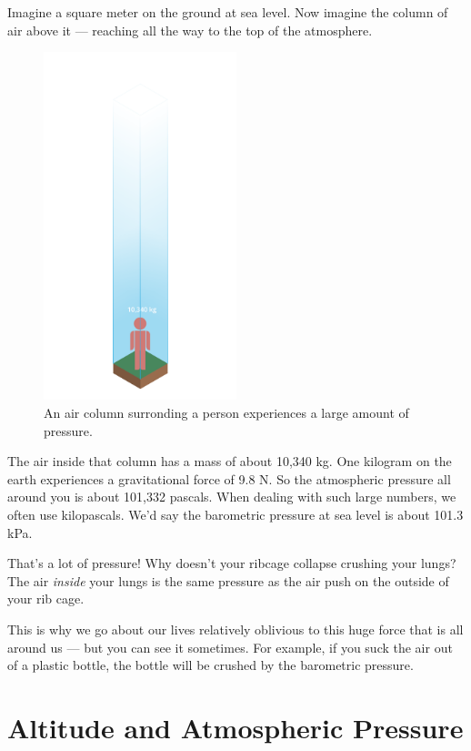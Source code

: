 Imagine a square meter on the ground at sea level.  Now imagine the column of air above it --- reaching all the way to the top of the atmosphere.
\begin{figure}[htbp]
    \centering
    \includegraphics[width=0.5\textwidth]{aircolumn.png}
    \caption{An air column surronding a person experiences a large amount of pressure.}
    \label{fig:aircolumn}
\end{figure}

The air inside that column has a mass of about 10,340 kg.  One kilogram on the earth experiences a gravitational force of 9.8 N.   
So the atmospheric pressure all around you is about 101,332 pascals.  
When dealing with such large numbers, we often use kilopascals.  
We'd say the barometric pressure at sea level is about 101.3 kPa.

That's a lot of pressure!  Why doesn't your ribcage collapse crushing your lungs?  The air \emph{inside} your lungs is the same 
pressure as the air push on the outside of your rib cage.  

This is why we go about our lives relatively oblivious to this huge force that is all around us --- but you can see it sometimes.  
For example, if you suck the air out of a plastic bottle, the bottle will be crushed by the barometric pressure.

\section{Altitude and Atmospheric Pressure}

